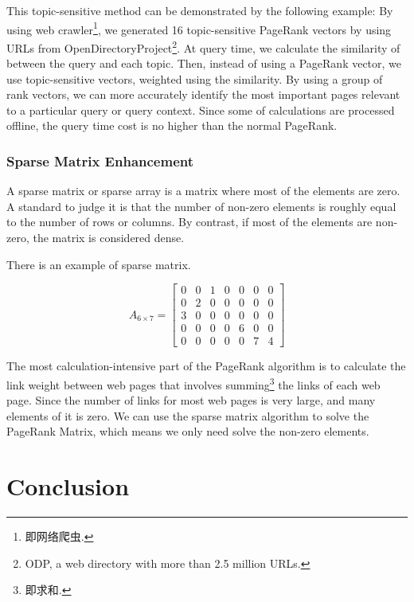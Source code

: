 \documentclass[lettersize,journal,12pt,conference]{IEEEtran}
\begin{document}
This topic-sensitive method can be demonstrated by the following example:\cite{ref7}
By using web crawler\footnote[3]{即网络爬虫.}, we generated 16 topic-sensitive PageRank vectors by using URLs from OpenDirectoryProject\footnote[4]{ODP, a web directory with more than 2.5 million URLs.}. 
At query time, we calculate the similarity of between the query and each topic. 
Then, instead of using a PageRank vector, we use topic-sensitive vectors, weighted using the similarity. 
By using a group of rank vectors, we can more accurately identify the most important pages relevant to a particular query or query context. 
Since some of calculations are processed offline, the query time cost is no higher than the normal PageRank.

\subsubsection{Sparse Matrix Enhancement}

A sparse matrix or sparse array is a matrix where most of the elements are zero. 
A standard to judge it is that the number of non-zero elements is roughly equal to the number of rows or columns. By contrast, if most of the elements are non-zero, the matrix is considered dense.

There is an example of sparse matrix.

\begin{equation}
	A_{6\times 7}=
	\begin{bmatrix}
		0&0&1&0&0&0&0\\
		0&2&0&0&0&0&0\\
		3&0&0&0&0&0&0\\
		0&0&0&0&6&0&0\\
		0&0&0&0&0&7&4
	\end{bmatrix}
\end{equation}

The most calculation-intensive part of the PageRank algorithm is to calculate the link weight between web pages that involves summing\footnote[1]{即求和.} the links of each web page. 
Since the number of links for most web pages is very large, and many elements of it is zero. We can use the sparse matrix algorithm to solve the PageRank Matrix, which means we only need solve the non-zero elements.


\section{Conclusion}
\end{document}
